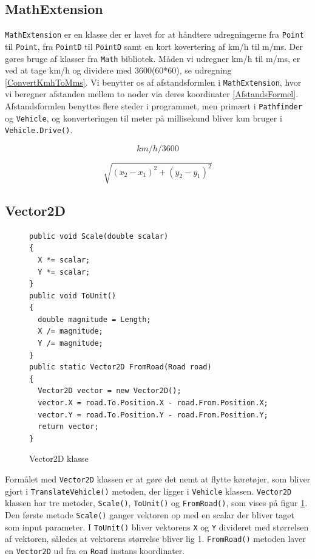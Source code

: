 \subsection{MathExtension}
\texttt{MathExtension} er en klasse der er lavet for at håndtere udregningerne fra \texttt{Point} til \texttt{Point}, fra \texttt{PointD} til \texttt{PointD} samt en kort kovertering af km/h til m/ms. Der gøres bruge af klasser fra \texttt{Math} bibliotek. Måden vi udregner km/h til m/ms, er ved at tage km/h og dividere med 3600(60*60), se udregning \ref{ConvertKmhToMms}. Vi benytter os af afstandsformlen i \texttt{MathExtension}, hvor vi beregner afstanden mellem to noder via deres koordinater \ref{AfstandsFormel}. Afstandsformlen benyttes flere steder i programmet, men primært i \texttt{Pathfinder} og \texttt{Vehicle}, og konverteringen til meter på millisekund bliver kun bruger i \texttt{Vehicle.Drive()}.

\begin{equation} \label{ConvertKmhToMms}
km/h / 3600
\end{equation}

\begin{equation} \label{AfstandsFormel}
\sqrt{(x_2 - x_1)^2 + (y_2 - y_1)^2}
\end{equation}

\subsection{Vector2D}
\begin{figure}[H]
\begin{lstlisting}
public void Scale(double scalar)
{
  X *= scalar;
  Y *= scalar;
}
public void ToUnit()
{
  double magnitude = Length;
  X /= magnitude;
  Y /= magnitude;
}
public static Vector2D FromRoad(Road road)
{
  Vector2D vector = new Vector2D();
  vector.X = road.To.Position.X - road.From.Position.X;
  vector.Y = road.To.Position.Y - road.From.Position.Y;
  return vector;
}
\end{lstlisting}
\caption{Vector2D klasse}\label{Vector2D}
\end{figure}

Formålet med \texttt{Vector2D} klassen er at gøre det nemt at flytte køretøjer, som bliver gjort i \texttt{TranslateVehicle()} metoden, der ligger i \texttt{Vehicle} klassen. \texttt{Vector2D} klassen har tre metoder, \texttt{Scale()}, \texttt{ToUnit()} og \texttt{FromRoad()}, som vises på figur \ref{Vector2D}. Den første metode \texttt{Scale()} ganger vektoren op med en scalar der bliver taget som input parameter. I \texttt{ToUnit()} bliver vektorens \texttt{X} og \texttt{Y} divideret med størrelsen af vektoren, således at vektorens størrelse bliver lig 1. \texttt{FromRoad()} metoden laver en \texttt{Vector2D} ud fra en \texttt{Road} instans koordinater.

